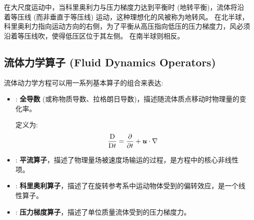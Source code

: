 \begin{insightbox}
    在大尺度运动中，当科里奥利力与压力梯度力达到平衡时 (地转平衡)，流体将沿着等压线 (而非垂直于等压线) 运动，这种理想化的风被称为地转风。
    在北半球，科里奥利力指向运动方向的右侧，为了平衡从高压指向低压的压力梯度力，风必须沿着等压线吹，使得低压区位于其左侧。
    在南半球则相反。
\end{insightbox}

\subsection{流体力学算子 (Fluid Dynamics Operators)}

流体动力学方程可以用一系列基本算子的组合来表达:
\begin{itemize}
    \item[$\matderiv{}$]: \textbf{全导数} (或称物质导数、拉格朗日导数)，描述随流体质点移动时物理量的变化率。

    定义为:
    \begin{equation}
        \matderiv{} = \pde{}{\timevar} + \vel \cdot \nabla
        \label{eq:material_derivative}
    \end{equation}

    \item[$\opA{\cdot}$]: \textbf{平流算子}，描述了物理量场被速度场输运的过程，是方程中的核心非线性项。

    \item[$\opC{\cdot}$]: \textbf{科里奥利算子}，描述了在旋转参考系中运动物体受到的偏转效应，是一个线性算子。

    \item[$\opP$]: \textbf{压力梯度算子}，描述了单位质量流体受到的压力梯度力。

\end{itemize}

